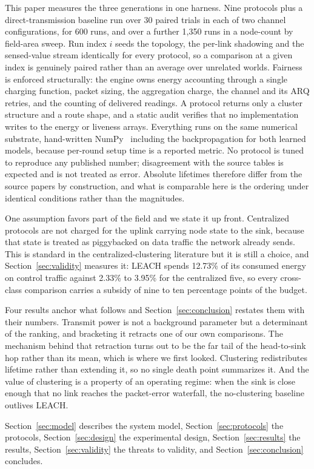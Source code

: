 This paper measures the three generations in one harness. Nine protocols plus a
direct-transmission baseline run over 30 paired trials in each of two channel
configurations, for 600 runs, and over a further 1{,}350 runs in a node-count by
field-area sweep. Run index $i$ seeds the topology, the per-link shadowing and
the sensed-value stream identically for every protocol, so a comparison at a
given index is genuinely paired rather than an average over unrelated worlds.
Fairness is enforced structurally: the engine owns energy accounting through a
single charging function, packet sizing, the aggregation charge, the channel and
its ARQ retries, and the counting of delivered readings. A protocol returns only
a cluster structure and a route shape, and a static audit verifies that no
implementation writes to the energy or liveness arrays. Everything runs on the
same numerical substrate, hand-written NumPy~\cite{harris2020numpy} including
the backpropagation for both learned models, because per-round setup time is a
reported metric. No protocol is tuned to reproduce any published number;
disagreement with the source tables is expected and is not treated as error.
Absolute lifetimes therefore differ from the source papers by construction, and
what is comparable here is the ordering under identical conditions rather than
the magnitudes.

One assumption favors part of the field and we state it up front. Centralized
protocols are not charged for the uplink carrying node state to the sink,
because that state is treated as piggybacked on data traffic the network already
sends. This is standard in the centralized-clustering literature but it is still
a choice, and Section~\ref{sec:validity} measures it: LEACH spends 12.73\% of
its consumed energy on control traffic against 2.33\% to 3.95\% for the
centralized five, so every cross-class comparison carries a subsidy of nine to
ten percentage points of the budget.

Four results anchor what follows and Section~\ref{sec:conclusion} restates them
with their numbers. Transmit power is not a background parameter but a
determinant of the ranking, and bracketing it retracts one of our own
comparisons. The mechanism behind that retraction turns out to be the far tail
of the head-to-sink hop rather than its mean, which is where we first looked.
Clustering redistributes lifetime rather than extending it, so no single death
point summarizes it. And the value of clustering is a property of an operating
regime: when the sink is close enough that no link reaches the packet-error
waterfall, the no-clustering baseline outlives LEACH.

Section~\ref{sec:model} describes the system model,
Section~\ref{sec:protocols} the protocols, Section~\ref{sec:design} the
experimental design, Section~\ref{sec:results} the results,
Section~\ref{sec:validity} the threats to validity, and
Section~\ref{sec:conclusion} concludes.
